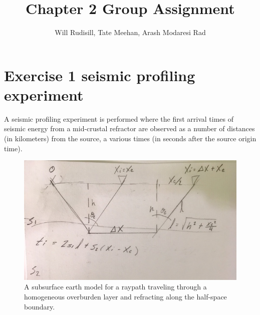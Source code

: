 \documentclass{article}
\title{Chapter 2 Group Assignment}
\author{Will Rudisill, Tate Meehan, Arash Modaresi Rad}
\begin{document}
\maketitle


\section*{Exercise 1 seismic profiling experiment}
A seismic profiling experiment is performed where the first arrival times of seismic energy from a mid-crustal refractor are observed as a number of distances (in kilometers) from the source, a various times (in seconds after the source origin time). 

\begin{figure}[h]
    \centering
    \includegraphics[width = \textwidth]{RefractionModel.jpg}
    \caption{A subsurface earth model for a raypath traveling through a homogeneous overburden layer and refracting along the half-space boundary. }
    \label{fig:refract}
\end{figure}
\FloatBarrier
\vspace{-15pt}
\end{document}

